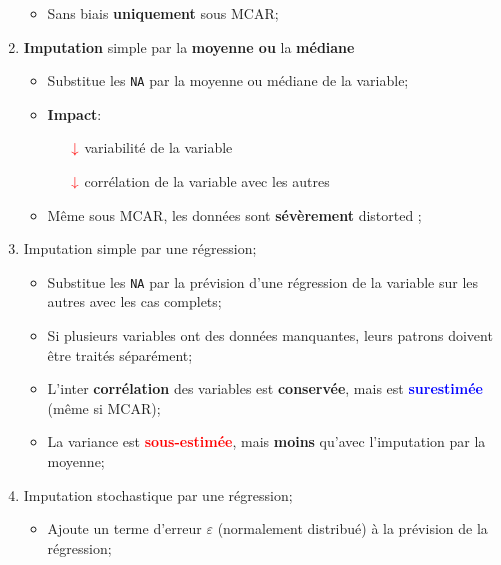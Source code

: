 \documentclass[10pt, french]{article}
\begin{document}
\begin{multicols*}{3}
\begin{enumerate}[leftmargin = *]
\begin{itemize}[leftmargin = *]
		\item	\textcolor{ao(english)}{Sans biais} \textbf{uniquement} sous \textcolor{ao(english)}{MCAR};
		\end{itemize}
	\item	\textbf{Imputation} simple par la \textbf{moyenne ou} la \textbf{médiane}
		\begin{itemize}[leftmargin = *]
		\item	Substitue les \texttt{NA} par la moyenne ou médiane de la variable;
		\item	\textbf{Impact}:
			\begin{itemize}[leftmargin = *]
			\item[$\color{red}\downarrow$]	variabilité de la variable	\\
			\item[$\color{red}\downarrow$]	corrélation de la variable avec les autres	\\
			\end{itemize}
		\item	Même sous MCAR, les données sont \textbf{sévèrement} \og distorted \fg{};
		\end{itemize}
	\item	Imputation simple par une régression;
		\begin{itemize}[leftmargin = *]
		\item	Substitue les \texttt{NA} par la prévision d'une régression de la variable sur les autres avec les cas complets;
		\item	Si plusieurs variables ont des données manquantes, leurs patrons doivent être traités séparément;
		\item	L'inter \textbf{corrélation} des variables est \textbf{conservée}, mais est \textcolor{blue}{\textbf{surestimée}} (même si MCAR);
		\item	La variance est \textcolor{red}{\textbf{sous-estimée}}, mais \textbf{moins} qu'avec l'imputation par la moyenne;
		\end{itemize}
	\item	Imputation stochastique par une régression;
		\begin{itemize}[leftmargin = *]
		\item	Ajoute un terme d'erreur $\varepsilon$ (normalement distribué) à la prévision de la régression;

\end{itemize}
\end{enumerate}
\end{multicols*}
\end{document}
